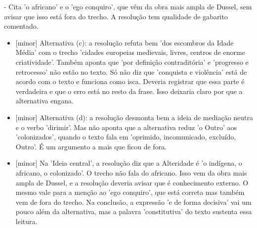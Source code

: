 \documentclass{article}%
\begin{document}
{-} Cita 'o africano' e o 'ego conquiro', que vêm da obra mais ampla de Dussel, sem avisar que isso está fora do trecho.\newline%
\newline%
A resolução tem qualidade de gabarito comentado.%
\begin{itemize}%
\item%
{[}minor{]} Alternativa (c): a resolução refuta bem 'dos escombros da Idade Média' com o trecho 'cidades europeias medievais, livres, centros de enorme criatividade'. Também aponta que 'por definição contraditória' e 'progresso e retrocesso' não estão no texto. Só não diz que 'conquista e violência' está de acordo com o texto e funciona como isca. Deveria registrar que essa parte é verdadeira e que o erro está no resto da frase. Isso deixaria claro por que a alternativa engana.%
\item%
{[}minor{]} Alternativa (d): a resolução desmonta bem a ideia de mediação neutra e o verbo 'dirimir'. Mas não aponta que a alternativa reduz 'o Outro' aos 'colonizados', quando o texto fala em 'oprimido, incomunicado, excluído, Outro'. É um argumento a mais que ficou de fora.%
\item%
{[}minor{]} Na 'Ideia central', a resolução diz que a Alteridade é 'o indígena, o africano, o colonizado'. O trecho não fala do africano. Isso vem da obra mais ampla de Dussel, e a resolução deveria avisar que é conhecimento externo. O mesmo vale para a menção ao 'ego conquiro', que está correta mas também vem de fora do trecho. Na conclusão, a expressão 'e de forma decisiva' vai um pouco além da alternativa, mas a palavra 'constitutiva' do texto sustenta essa leitura.%
\end{itemize}%
\end{document}
